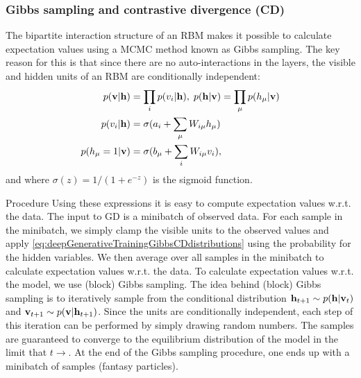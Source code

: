 \subsubsection{Gibbs sampling and contrastive divergence (CD)}
\label{sububsec:deepGenerativeTrainingGibbsCD}
The bipartite interaction structure of an RBM makes it possible to calculate expectation values using a MCMC method known as Gibbs sampling. The key reason for this is that since there are no auto-interactions in the layers, the visible and hidden units of an RBM are conditionally independent:
\begin{align}
	\label{eq:deepGenerativeTrainingGibbsCDdistributions}
	p(\mathbf{v} |\mathbf{h}) &= \prod_i p(v_i|\mathbf{h}),\; p(\mathbf{h}|\mathbf{v}) = \prod_\mu p(h_\mu|\mathbf{v}) \nonumber \\
	p(v_i|\mathbf{h}) &=\sigma(a_i +\sum_\mu W_{i\mu} h_\mu) \\
	p(h_\mu =1 |\mathbf{v}) &= \sigma(b_\mu + \sum_i W_{i\mu} v_i)\nonumber,
\end{align}
and where $\sigma(z)=1/(1+e^{-z})$ is the sigmoid function.\\
\begin{mybox}{Procedure}
	Using these expressions it is easy to compute expectation values w.r.t. the data. The input to GD is a minibatch of observed data. For each sample in the minibatch, we simply clamp the visible units to the observed values and apply \ref{eq:deepGenerativeTrainingGibbsCDdistributions} using the probability for the hidden variables. We then average over all samples in the minibatch to calculate expectation values w.r.t. the data. To calculate expectation values w.r.t. the model, we use (block) Gibbs sampling. The idea behind (block) Gibbs sampling is to iteratively sample from the conditional distribution $\mathbf{h}_{t+1} \sim p(\mathbf{h} |\mathbf{v}_t)$ and $\mathbf{v}_{t+1} \sim p(\mathbf{v}|\mathbf{h}_{t+1})$. Since the units are conditionally independent, each step of this iteration can be performed by simply drawing random numbers. The samples are guaranteed to converge to the equilibrium distribution of the model in the limit that $t\rightarrow$. At the end of the Gibbs sampling procedure, one ends up with a minibatch of samples (fantasy particles).
\end{mybox}
